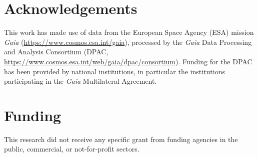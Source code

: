 \documentclass[preprint,12pt]{elsarticle}
\begin{document}
\section*{Acknowledgements}

This work has made use of data from the European Space Agency (ESA) mission \emph{Gaia}
(\url{https://www.cosmos.esa.int/gaia}), processed by the \emph{Gaia} Data Processing and
Analysis Consortium (DPAC, \url{https://www.cosmos.esa.int/web/gaia/dpac/consortium}).
Funding for the DPAC has been provided by national institutions, in particular the
institutions participating in the \emph{Gaia} Multilateral Agreement.

\section*{Funding}

This research did not receive any specific grant from funding agencies in the public,
commercial, or not-for-profit sectors.
\end{document}
